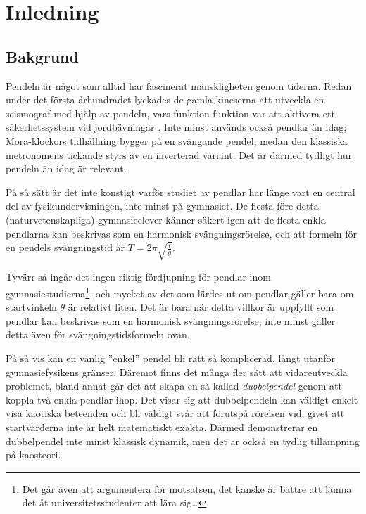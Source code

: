 \chapter*{Inledning}

\section{Bakgrund}
Pendeln är något som alltid har fascinerat mänskligheten genom tiderna. Redan under det första århundradet lyckades de gamla kineserna att utveckla en seismograf med hjälp av pendeln, vars funktion funktion var att aktivera ett säkerhetssystem vid jordbävningar \cite{book:china_history}. Inte minst används också pendlar än idag; Mora-klockors tidhållning bygger på en svängande pendel, medan den klassiska metronomens tickande styrs av en inverterad variant. Det är därmed tydligt hur pendeln än idag är relevant.

På så sätt är det inte konstigt varför studiet av pendlar har länge vart en central del av fysikundervisningen, inte minst på gymnasiet. De flesta före detta (naturvetenskapliga) gymnasieelever känner säkert igen att de flesta enkla pendlarna kan beskrivas som en harmonisk svängningsrörelse, och att formeln för en pendels svängningstid är $T = 2\pi\sqrt{\frac{l}{g}}$. 

Tyvärr så ingår det ingen riktig fördjupning för pendlar inom gymnasiestudierna\footnote{Det går även att argumentera för motsatsen, det kanske är bättre att lämna det åt universitetsstudenter att lära sig\dots}, och mycket av det som lärdes ut om pendlar gäller bara om startvinkeln $\theta$ är relativt liten. Det är bara när detta villkor är uppfyllt som pendlar kan beskrivas som en harmonisk svängningsrörelse, inte minst gäller detta även för svängningstidsformeln ovan.

På så vis kan en vanlig ''enkel'' pendel bli rätt så komplicerad, långt utanför gymnasiefysikens gränser. Däremot finns det många fler sätt att vidareutveckla problemet, bland annat går det att skapa en så kallad \emph{dubbelpendel} genom att koppla två enkla pendlar ihop. Det visar sig att dubbelpendeln kan väldigt enkelt visa kaotiska beteenden och bli väldigt svår att förutspå rörelsen vid, givet att startvärderna inte är helt matematiskt exakta. Därmed demonstrerar en dubbelpendel inte minst klassisk dynamik, men det är också en tydlig tillämpning på kaosteori.


